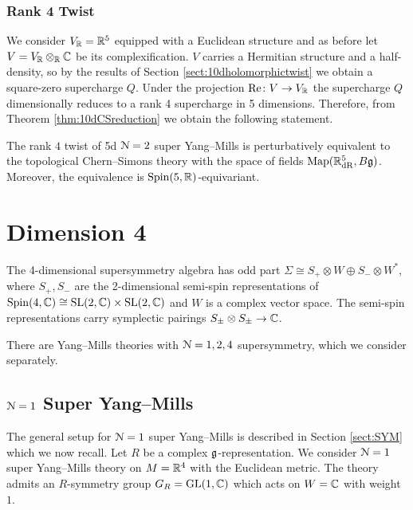 \documentclass[10pt, oneside]{article}
\renewcommand{\Re}{\mathrm{Re}}
\begin{document}
\subsubsection{Rank 4 Twist}
\label{sect:5drank4twist}

We consider $V_\mathbb R=\mathbb R^5$ equipped with a Euclidean structure and as before let $V=V_\mathbb R\otimes_\mathbb R\mathbb C$ be its complexification. $V$ carries a Hermitian structure and a half-density, so by the results of Section \ref{sect:10dholomorphictwist} we obtain a square-zero supercharge $Q$. Under the projection $\Re\colon V\rightarrow V_\RR$ the supercharge $Q$ dimensionally reduces to a rank 4 supercharge in 5 dimensions. Therefore, from Theorem \ref{thm:10dCSreduction} we obtain the following statement.

\begin{theorem}
The rank $4$ twist of 5d $\mathcal N=2$ super Yang--Mills is perturbatively equivalent to the topological Chern--Simons theory with the space of fields $\operatorname{Map}(\mathbb R^5_{\mathrm{dR}}, B\mathfrak g)$. Moreover, the equivalence is $\mathrm{Spin}(5, \mathbb R)$-equivariant.
\end{theorem}
 
\section{Dimension 4}

The 4-dimensional supersymmetry algebra has odd part $\Sigma\cong S_+\otimes W\oplus S_-\otimes W^*$, where $S_+, S_-$ are the 2-dimensional semi-spin representations of $\mathrm{Spin}(4, \mathbb C)\cong \mathrm{SL}(2, \mathbb C) \times \mathrm{SL}(2, \mathbb C)$ and $W$ is a complex vector space. The semi-spin representations carry symplectic pairings $S_\pm\otimes S_\pm\rightarrow \mathbb C$.

There are Yang--Mills theories with $\mathcal N=1,2,4$ supersymmetry, which we consider separately.

\subsection{\texorpdfstring{$\mathcal N=1$}{N=1} Super Yang--Mills} \label{sect:4d_1_section}
The general setup for $\mathcal N=1$ super Yang--Mills is described in Section \ref{sect:SYM} which we now recall.  Let $R$ be a complex $\mathfrak g$-representation. We consider $\mathcal N=1$ super Yang--Mills theory on $M=\mathbb R^4$ with the Euclidean metric. The theory admits an $R$-symmetry group $G_R=\mathrm{GL}(1, \mathbb C)$ which acts on $W=\mathbb C$ with weight $1$.

\vspace{-10pt}
\end{document}

